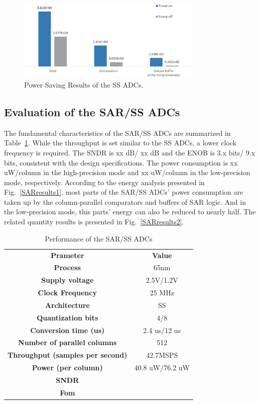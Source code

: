 \documentclass[conference]{IEEEtran}
\begin{document}
\begin{figure}[htbp]
	\centerline{\includegraphics[width=3.5in]{./Figures/SSResults2.eps}}
	\caption{Power Saving Results of the SS ADCs.}
	\label{SSresults2}
\end{figure} 

\subsection{Evaluation of the SAR/SS ADCs}
The fundamental characteristics of the SAR/SS ADCs are summarized in Table~\ref{tab2}. While the throughput is set similar to the SS ADCs, a lower clock frequency is required. The SNDR is xx dB/ xx dB and the ENOB is 3.x bits/ 9.x bits, consistent with the design specifications. The power consumption is xx uW/column in the high-precision mode and xx uW/column in the low-precision mode, respectively. According to the energy analysis presented in Fig.~\ref{SARresults1}, most parts of the SAR/SS ADCs' power consumption are taken up by the column-parallel comparators and buffers of SAR logic. And in the low-precision mode, this parts' energy can also be reduced to nearly half. The related quantity results is presented in Fig.~\ref{SARresults2}.
\begin{table}[htbp]
	\caption{Performance of the SAR/SS ADCs}
	\begin{center}
		\begin{tabular}{|c|c|}
			\hline
			\textbf{Prameter}& \textbf{Value} \\
			\hhline{|==|}
			\textbf{Process}& 65nm \\
			\hline 
			\textbf{Supply voltage}& 2.5V/1.2V \\
			\hline
			\textbf{Clock Frequency}&	25 MHz \\
			\hline
			\textbf{Architecture}&	SS \\
			\hline
			\textbf{Quantization bits}&	4/8 \\
			\hline
			\textbf{Conversion time (us)}&	2.4 us/12 us \\
			\hline
			\textbf{Number of parallel columns}&	512 \\
			\hline
			\textbf{Throughput (samples per second)}&	42.7MSPS \\ 
			\hline
			\textbf{Power (per column)}&	40.8 uW/76.2 uW \\
			\hline
			\textbf{SNDR}& \\
			\hline
			\textbf{Fom}& \\
			\hline	    
		\end{tabular}
		\label{tab2}
	\end{center}
\end{table}
\end{document}
